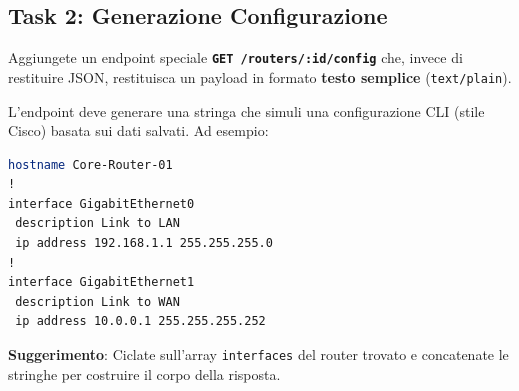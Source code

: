 \documentclass[11pt,a4paper]{article}
\begin{document}
\subsection{Task 2: Generazione Configurazione}
Aggiungete un endpoint speciale \textbf{\texttt{GET /routers/:id/config}} che, invece di restituire JSON, restituisca un payload in formato \textbf{testo semplice} (\texttt{text/plain}).

L'endpoint deve generare una stringa che simuli una configurazione CLI (stile Cisco) basata sui dati salvati. Ad esempio:
\begin{lstlisting}[language=bash, caption=Esempio di output atteso per /config]
hostname Core-Router-01
!
interface GigabitEthernet0
 description Link to LAN
 ip address 192.168.1.1 255.255.255.0
!
interface GigabitEthernet1
 description Link to WAN
 ip address 10.0.0.1 255.255.255.252
\end{lstlisting}

\textbf{Suggerimento}: Ciclate sull'array \texttt{interfaces} del router trovato e concatenate le stringhe per costruire il corpo della risposta.
\end{document}
